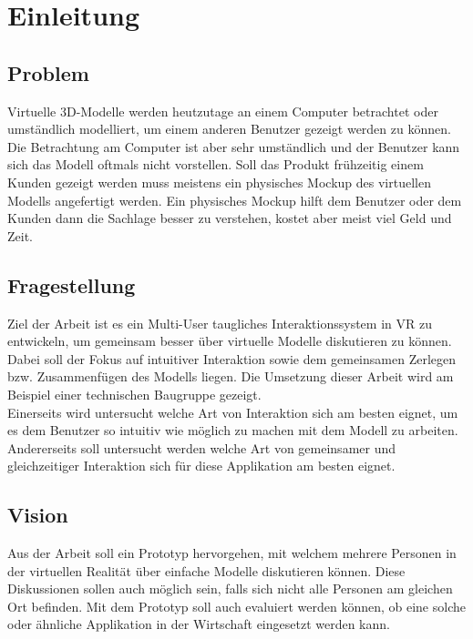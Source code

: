 \chapter{Einleitung}
\label{ch:Einleitung}

\section{Problem}

Virtuelle 3D-Modelle werden heutzutage an einem Computer betrachtet oder umständlich modelliert, um einem anderen Benutzer gezeigt werden zu können. Die Betrachtung am Computer ist aber sehr umständlich und der Benutzer kann sich das Modell oftmals nicht vorstellen. Soll das Produkt frühzeitig einem Kunden gezeigt werden muss meistens ein physisches Mockup des virtuellen Modells angefertigt werden. Ein physisches Mockup hilft dem Benutzer oder dem Kunden dann die Sachlage besser zu verstehen, kostet aber meist viel Geld und Zeit.

\section{Fragestellung}

Ziel der Arbeit ist es ein Multi-User taugliches Interaktionssystem in VR zu entwickeln, um gemeinsam besser über virtuelle Modelle diskutieren zu können. Dabei soll der Fokus auf intuitiver Interaktion sowie dem gemeinsamen Zerlegen bzw. Zusammenfügen des Modells liegen. Die Umsetzung dieser Arbeit wird am Beispiel einer technischen Baugruppe gezeigt. \\

\noindent Einerseits wird untersucht welche Art von Interaktion sich am besten eignet, um es dem Benutzer so intuitiv wie möglich zu machen mit dem Modell zu arbeiten. Andererseits soll untersucht werden welche Art von gemeinsamer und gleichzeitiger Interaktion sich für diese Applikation am besten eignet.

\section{Vision}

Aus der Arbeit soll ein Prototyp hervorgehen, mit welchem mehrere Personen in der virtuellen Realität über einfache Modelle diskutieren können. Diese Diskussionen sollen auch möglich sein, falls sich nicht alle Personen am gleichen Ort befinden.
Mit dem Prototyp soll auch evaluiert werden können, ob eine solche oder ähnliche Applikation in der Wirtschaft eingesetzt werden kann. 